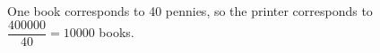 One book corresponds to 40 pennies, so the printer corresponds to $\dfrac{400000}{40}=\boxed{10000}$ books.
